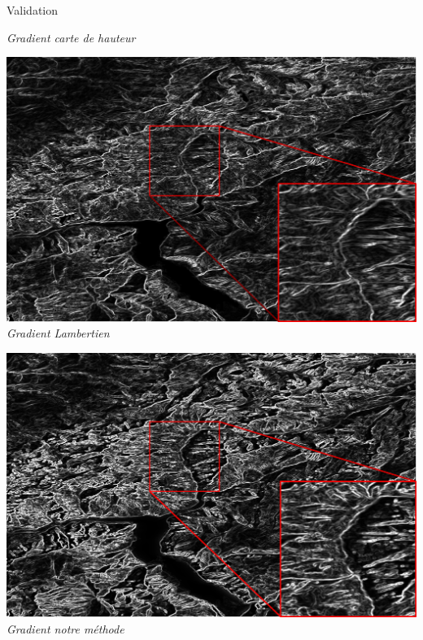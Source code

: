 \documentclass{beamer}
\begin{document}
\begin{frame}[noframenumbering]{Validation}
\begin{onlyenv}
\begin{center}
\begin{minipage}[t]{0.32\linewidth}
\begin{center}
 		\textit{Gradient carte de hauteur}
    \end{center}
    \end{minipage}
    \begin{minipage}[t]{0.32\linewidth}
    \begin{center}
    	\includegraphics[width=1.0\linewidth]{Resultats/gradient_lambertien.png}\\
 		\textit{Gradient Lambertien}
    \end{center}
    \end{minipage}
        \begin{minipage}[t]{0.32\linewidth}
    \begin{center}
    	\includegraphics[width=1.0\linewidth]{Resultats/gradient_our.png}\\
 		\textit{Gradient notre méthode}
    \end{center}
    \end{minipage}
    \end{center}

\end{onlyenv}
\end{frame}
\end{document}
